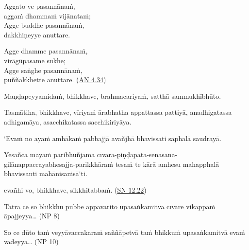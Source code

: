 \documentclass[11pt,oneside]{memoir}
\begin{document}
\begin{widecols}
Aggato ve pasannānaṁ, \\[0pt]
aggaṁ dhammaṁ vijānataṁ; \\[0pt]
Agge buddhe pasannānaṁ, \\[0pt]
dakkhiṇeyye anuttare.

Agge dhamme pasannānaṁ, \\[0pt]
virāgūpasame sukhe; \\[0pt]
Agge saṅghe pasannānaṁ, \\[0pt]
puññakkhette anuttare. (\href{https://suttacentral.net/an4.34/pli/ms}{AN 4.34})

Maṇḍapeyyamidaṁ, bhikkhave, brahmacariyaṁ, satthā sammukhībhūto.

Tasmātiha, bhikkhave, vīriyaṁ ārabhatha appattassa pattiyā, anadhigatassa
adhigamāya, asacchikatassa sacchikiriyāya.

`Evaṁ no ayaṁ amhākaṁ pabbajjā avañjhā bhavissati saphalā saudrayā.

Yesañca mayaṁ paribhuñjāma
cīvara-piṇḍapāta-senāsana-gilānappaccayabhesajja-parikkhāraṁ tesaṁ te kārā
amhesu mahapphalā bhavissanti mahānisaṁsā`ti.

evañhi vo, bhikkhave, sikkhitabbaṁ. (\href{https://suttacentral.net/sn12.22/en/sujato}{SN 12.22})

Tatra ce so bhikkhu pubbe appavārito upasaṅkamitvā cīvare vikappaṁ āpajjeyya\ldots{} (NP 8)

So ce dūto taṁ veyyāvaccakaraṁ saññāpetvā taṁ bhikkuṁ upasaṅkamitvā evaṁ vadeyya\ldots{} (NP 10)

\columnbreak


\end{widecols}
\end{document}
